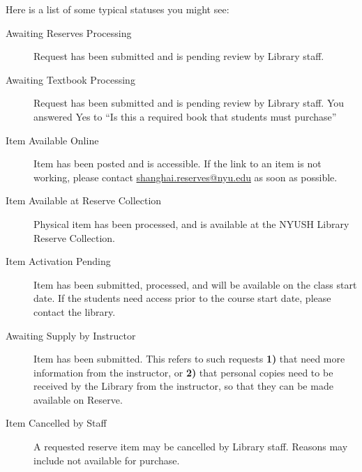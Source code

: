 Here is a list of some typical statuses you might see:
\begin{description}
\item[Awaiting Reserves Processing] Request has been submitted and is pending review by Library staff.

\item[Awaiting Textbook Processing] Request has been submitted and is pending review by Library staff. You answered Yes to ``Is this a required book that students must purchase'' 

\item[Item Available Online] Item has been posted and is accessible. If the link to an item is not working, please contact \href{mailto:shanghai.reserves@nyu.edu}{shanghai.reserves@nyu.edu} as soon as possible.

\item[Item Available at Reserve Collection] Physical item has been processed, and is available at the NYUSH Library Reserve Collection.

\item[Item Activation Pending] Item has been submitted, processed, and will be available on the class start date. If the students need access prior to the course start date, please contact the library.

\item[Awaiting Supply by Instructor] Item has been submitted. This refers to such requests \textbf{1)} that need more information from the instructor, or \textbf{2)} that personal copies need to be received by the Library from the instructor, so that they can be made available on Reserve.

\item[Item Cancelled by Staff] A requested reserve item may be cancelled by Library staff.  Reasons may include not available for purchase.
\end{description}


